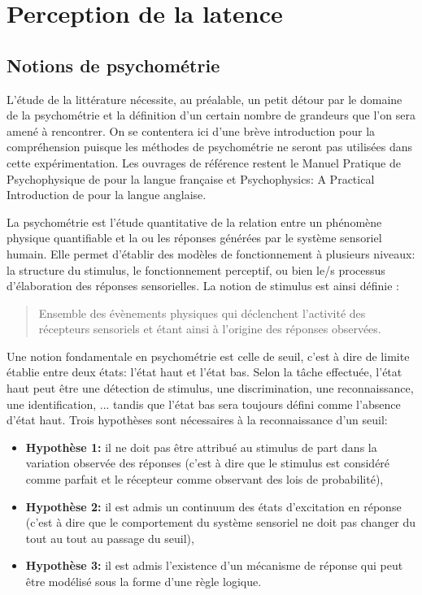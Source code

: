	\section{Perception de la latence}
	\subsection{Notions de psychométrie}
	\par L'étude de la littérature nécessite, au préalable, un petit détour par le domaine de la psychométrie et la définition d'un certain nombre de grandeurs que l'on sera amené à rencontrer. On se contentera ici d'une brève introduction pour la compréhension puisque les méthodes de psychométrie ne seront pas utilisées dans cette expérimentation. Les ouvrages de référence restent le Manuel Pratique de Psychophysique de \citep{bonnet_manuel_1986} pour la langue française et Psychophysics: A Practical Introduction de \citep{kingdom_psychophysics:_2010} pour la langue anglaise.
	
	\par La psychométrie est l'étude quantitative de la relation entre un phénomène physique quantifiable et la ou les réponses générées par le système sensoriel humain. Elle permet d'établir des modèles de fonctionnement à plusieurs niveaux: la structure du stimulus, le fonctionnement perceptif, ou bien le/s processus d'élaboration des réponses sensorielles. La notion de stimulus est ainsi définie \citep{bonnet_manuel_1986}:
	\begin{quote}
		Ensemble des évènements physiques qui déclenchent l'activité des récepteurs sensoriels et étant ainsi à l'origine des réponses observées.
	\end{quote}
	
	\par Une notion fondamentale en psychométrie est celle de seuil, c'est à dire de limite établie entre deux états: l'état haut et l'état bas. Selon la tâche effectuée, l'état haut peut être une détection de stimulus, une discrimination, une reconnaissance, une identification, ... tandis que l'état bas sera toujours défini comme l'absence d'état haut. Trois hypothèses sont nécessaires à la reconnaissance d'un seuil:
	\begin{itemize}
		\item \textbf{Hypothèse 1:} il ne doit pas être attribué au stimulus de part dans la variation observée des réponses (c'est à dire que le stimulus est considéré comme parfait et le récepteur comme observant des lois de probabilité),
		\item \textbf{Hypothèse 2:} il est admis un continuum des états d'excitation en réponse (c'est à dire que le comportement du système sensoriel ne doit pas changer du tout au tout au passage du seuil),
		\item \textbf{Hypothèse 3:} il est admis l'existence d'un mécanisme de réponse qui peut être modélisé sous la forme d'une règle logique.
	\end{itemize}		
	
